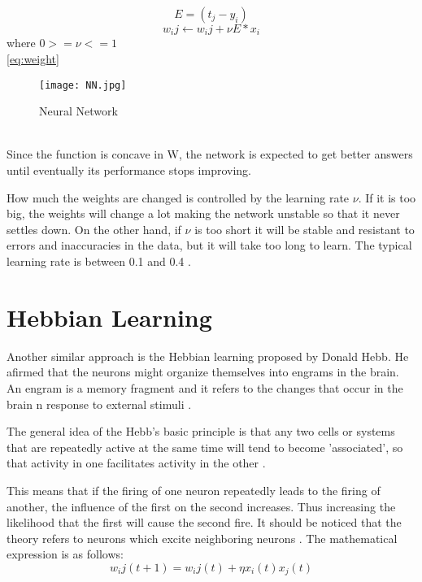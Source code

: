 \begin{equation}
\label{eq:error}
E=(t_j - y_i)
\end{equation}
\begin{equation}
\label{eq:weight}
w_ij \leftarrow w_ij+\nu E * x_i
\end{equation} where $0>=\nu<=1$ \\
\ref{eq:weight}
\begin{figure}
\label{fig:nn}
\center
\texttt{[image: NN.jpg]}
\caption{Neural Network}
\end{figure}
\\
Since the function is concave in W, the network is expected to get better answers until eventually its performance stops improving.

How much the weights are changed is controlled by the learning rate $\nu$. If it is too big, the weights will change a lot  making the network unstable so that it never settles down. On the other hand, if $\nu$ is too short it will be stable and resistant to errors and inaccuracies in the data, but it will take too long to learn. The typical learning rate is between 0.1 and 0.4 \cite{marsland2015machine}.

\section{Hebbian Learning}
Another similar approach is the Hebbian learning proposed by Donald Hebb. He afirmed that the neurons might organize themselves into engrams in the brain. An engram is a memory fragment and it refers to the changes that occur in the brain n response to external stimuli \cite{strom2007hebbian}.

The general idea of the Hebb's basic principle is that any two cells or systems that are repeatedly active at the same time will tend to become 'associated', so that activity in one facilitates activity in the other \cite{morris1999hebb}.

This means that if the firing of one neuron repeatedly leads to the firing of another, the influence of the first on the second increases. Thus increasing the likelihood that the  first will cause the second fire.
It should be noticed that the theory refers to neurons which excite neighboring neurons \cite{strom2007hebbian}.
The mathematical expression is as follows:
\begin{equation}
\label{eq:hebbianrule}
w_ij (t+1)= w_ij(t)+\eta x_i(t)x_j(t)
\end{equation}

